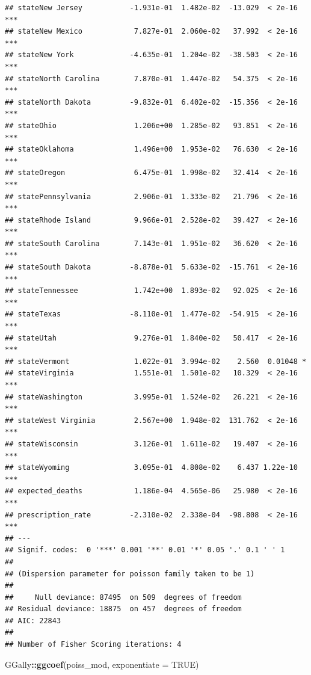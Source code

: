 \documentclass[]{article}
\newenvironment{Shaded}{\begin{snugshade}}{\end{snugshade}}
\newcommand{\DataTypeTok}[1]{\textcolor[rgb]{0.13,0.29,0.53}{#1}}
\newcommand{\KeywordTok}[1]{\textcolor[rgb]{0.13,0.29,0.53}{\textbf{#1}}}
\newcommand{\NormalTok}[1]{#1}
\newcommand{\OperatorTok}[1]{\textcolor[rgb]{0.81,0.36,0.00}{\textbf{#1}}}
\newcommand{\OtherTok}[1]{\textcolor[rgb]{0.56,0.35,0.01}{#1}}
\begin{document}
\begin{verbatim}
## stateNew Jersey           -1.931e-01  1.482e-02  -13.029  < 2e-16 ***
## stateNew Mexico            7.827e-01  2.060e-02   37.992  < 2e-16 ***
## stateNew York             -4.635e-01  1.204e-02  -38.503  < 2e-16 ***
## stateNorth Carolina        7.870e-01  1.447e-02   54.375  < 2e-16 ***
## stateNorth Dakota         -9.832e-01  6.402e-02  -15.356  < 2e-16 ***
## stateOhio                  1.206e+00  1.285e-02   93.851  < 2e-16 ***
## stateOklahoma              1.496e+00  1.953e-02   76.630  < 2e-16 ***
## stateOregon                6.475e-01  1.998e-02   32.414  < 2e-16 ***
## statePennsylvania          2.906e-01  1.333e-02   21.796  < 2e-16 ***
## stateRhode Island          9.966e-01  2.528e-02   39.427  < 2e-16 ***
## stateSouth Carolina        7.143e-01  1.951e-02   36.620  < 2e-16 ***
## stateSouth Dakota         -8.878e-01  5.633e-02  -15.761  < 2e-16 ***
## stateTennessee             1.742e+00  1.893e-02   92.025  < 2e-16 ***
## stateTexas                -8.110e-01  1.477e-02  -54.915  < 2e-16 ***
## stateUtah                  9.276e-01  1.840e-02   50.417  < 2e-16 ***
## stateVermont               1.022e-01  3.994e-02    2.560  0.01048 *  
## stateVirginia              1.551e-01  1.501e-02   10.329  < 2e-16 ***
## stateWashington            3.995e-01  1.524e-02   26.221  < 2e-16 ***
## stateWest Virginia         2.567e+00  1.948e-02  131.762  < 2e-16 ***
## stateWisconsin             3.126e-01  1.611e-02   19.407  < 2e-16 ***
## stateWyoming               3.095e-01  4.808e-02    6.437 1.22e-10 ***
## expected_deaths            1.186e-04  4.565e-06   25.980  < 2e-16 ***
## prescription_rate         -2.310e-02  2.338e-04  -98.808  < 2e-16 ***
## ---
## Signif. codes:  0 '***' 0.001 '**' 0.01 '*' 0.05 '.' 0.1 ' ' 1
## 
## (Dispersion parameter for poisson family taken to be 1)
## 
##     Null deviance: 87495  on 509  degrees of freedom
## Residual deviance: 18875  on 457  degrees of freedom
## AIC: 22843
## 
## Number of Fisher Scoring iterations: 4
\end{verbatim}

\begin{Shaded}
\begin{Highlighting}[]
\NormalTok{GGally}\OperatorTok{::}\KeywordTok{ggcoef}\NormalTok{(poiss_mod, }\DataTypeTok{exponentiate =} \OtherTok{TRUE}\NormalTok{)}
\end{Highlighting}
\end{Shaded}
\end{document}

